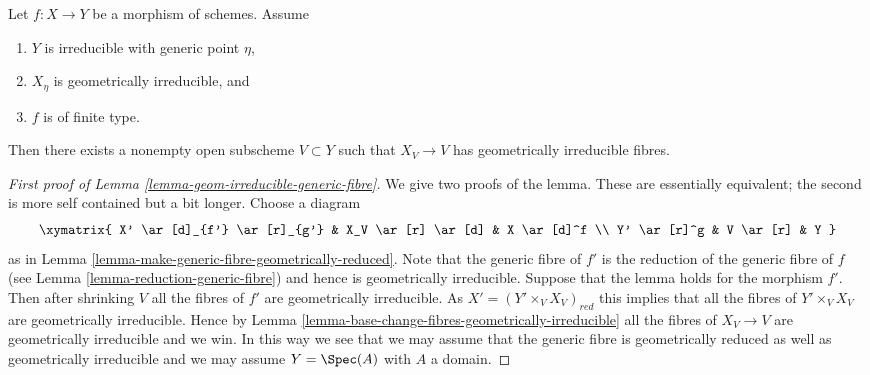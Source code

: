 \begin{lemma}
\label{lemma-geom-irreducible-generic-fibre}
Let $f : X \to Y$ be a morphism of schemes.
Assume
\begin{enumerate}
\item $Y$ is irreducible with generic point $\eta$,
\item $X_\eta$ is geometrically irreducible, and
\item $f$ is of finite type.
\end{enumerate}
Then there exists a nonempty open subscheme $V \subset Y$
such that $X_V \to V$ has geometrically irreducible fibres.
\end{lemma}

\begin{proof}[First proof of Lemma \ref{lemma-geom-irreducible-generic-fibre}]
We give two proofs of the lemma. These are essentially equivalent;
the second is more self contained but a bit longer.
Choose a diagram
$$
\xymatrix{
X' \ar[d]_{f'} \ar[r]_{g'} & X_V \ar[r] \ar[d] & X \ar[d]^f \\
Y' \ar[r]^g & V \ar[r] & Y
}
$$
as in
Lemma \ref{lemma-make-generic-fibre-geometrically-reduced}.
Note that the generic fibre of $f'$ is the reduction of the
generic fibre of $f$ (see
Lemma \ref{lemma-reduction-generic-fibre})
and hence is geometrically irreducible.
Suppose that the lemma holds for the morphism $f'$. Then after shrinking
$V$ all the fibres of $f'$ are geometrically irreducible.
As $X' = (Y' \times_V X_V)_{red}$ this implies that all the fibres
of $Y' \times_V X_V$ are geometrically irreducible. Hence by
Lemma \ref{lemma-base-change-fibres-geometrically-irreducible}
all the fibres of $X_V \to V$ are geometrically irreducible and
we win. In this way we see that we may assume that the generic
fibre is geometrically reduced as well as geometrically irreducible
and we may assume $Y = \Spec(A)$ with $A$ a domain.


\end{proof}
